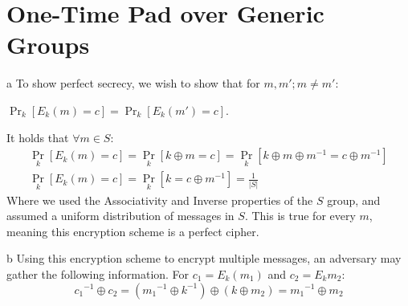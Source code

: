 \documentclass{article}
\begin{document}
\section{One-Time Pad over Generic Groups}
\begin{paragraph}
	a To show perfect secrecy, we wish to show that for ${m, m' ; m \neq m':}$

	${\Pr_k[E_k(m) = c] = \Pr_k[E_k(m') = c]}$.

	It holds that ${\forall m \in S}$:
	\begin{gather*}
		\Pr_k[E_k(m) = c] = \Pr_k[k \oplus m = c] = \Pr_k[k \oplus m \oplus m^{-1} = c \oplus m^{-1}] \\
		\Pr_k[E_k(m) = c] = \Pr_k[k = c \oplus m^{-1}] = \frac{1}{\lvert S \rvert}
	\end{gather*}
	Where we used the Associativity and Inverse properties of the ${S}$ group, and assumed a uniform distribution
	of messages in ${S}$. This is true for every ${m}$, meaning this encryption scheme is a perfect cipher.
\end{paragraph}
\begin{paragraph}
	b Using this encryption scheme to encrypt multiple messages, an adversary may gather the following information.
	For ${c_1 = E_k(m_1)}$ and ${c_2 = E_k{m_2}}$:
	\begin{equation*}
		{c_1}^{-1} \oplus c_2 = ({m_1}^{-1} \oplus k^{-1}) \oplus (k \oplus m_2) = {m_1}^{-1} \oplus m_2
	\end{equation*}
\end{paragraph}
\end{document}
